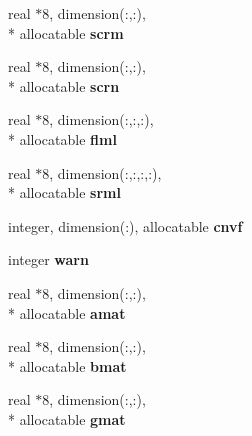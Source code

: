 \begin{DoxyCompactItemize}
\item 
\hypertarget{classsolvar_ad0ad5f0816aca0106d4134aab048b587}{real $\ast$8, dimension(\+:,\+:), \\*
allocatable {\bfseries scrm}}\label{classsolvar_ad0ad5f0816aca0106d4134aab048b587}

\item 
\hypertarget{classsolvar_afc399fa0331d458dd61344f29e86c2b0}{real $\ast$8, dimension(\+:,\+:), \\*
allocatable {\bfseries scrn}}\label{classsolvar_afc399fa0331d458dd61344f29e86c2b0}

\item 
\hypertarget{classsolvar_a44ac6f0ee1f3ef4e2dd9ac365a56ea1e}{real $\ast$8, dimension(\+:,\+:,\+:), \\*
allocatable {\bfseries flml}}\label{classsolvar_a44ac6f0ee1f3ef4e2dd9ac365a56ea1e}

\item 
\hypertarget{classsolvar_a93d4e25e0a75a026fc99fad34fb16f92}{real $\ast$8, dimension(\+:,\+:,\+:,\+:), \\*
allocatable {\bfseries srml}}\label{classsolvar_a93d4e25e0a75a026fc99fad34fb16f92}

\item 
\hypertarget{classsolvar_af5b34b344517ef2166afc04c426e27a2}{integer, dimension(\+:), allocatable {\bfseries cnvf}}\label{classsolvar_af5b34b344517ef2166afc04c426e27a2}

\item 
\hypertarget{classsolvar_a77a98f936638344888462eef093e6580}{integer {\bfseries warn}}\label{classsolvar_a77a98f936638344888462eef093e6580}

\item 
\hypertarget{classsolvar_a58627fb8898ac77ba68157b4335132dd}{real $\ast$8, dimension(\+:,\+:), \\*
allocatable {\bfseries amat}}\label{classsolvar_a58627fb8898ac77ba68157b4335132dd}

\item 
\hypertarget{classsolvar_a20f6846ca2c1dcc99975895992079c4a}{real $\ast$8, dimension(\+:,\+:), \\*
allocatable {\bfseries bmat}}\label{classsolvar_a20f6846ca2c1dcc99975895992079c4a}

\item 
\hypertarget{classsolvar_a52d7e95aa15399c2d8374e4d81fa4786}{real $\ast$8, dimension(\+:,\+:), \\*
allocatable {\bfseries gmat}}\label{classsolvar_a52d7e95aa15399c2d8374e4d81fa4786}


\end{DoxyCompactItemize}
